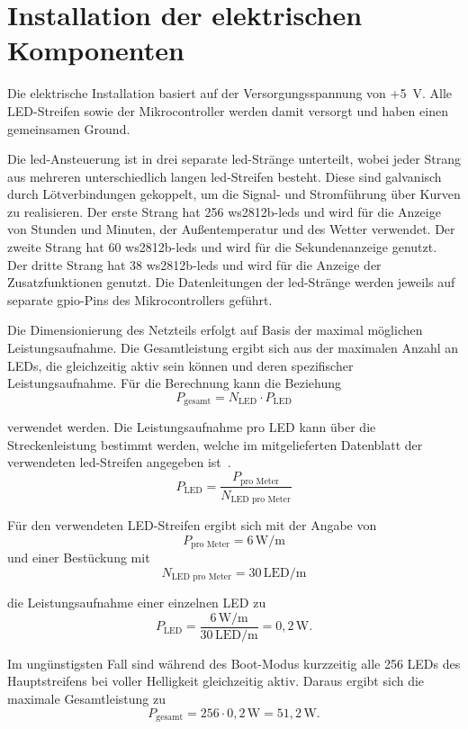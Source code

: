 \section{Installation der elektrischen Komponenten}
Die elektrische Installation basiert auf der Versorgungsspannung von +5~V.  
Alle LED-Streifen sowie der Mikrocontroller werden damit versorgt und haben einen gemeinsamen Ground.  

Die \gls{led}-Ansteuerung ist in drei separate \gls{led}-Stränge unterteilt, wobei jeder Strang aus mehreren unterschiedlich langen \gls{led}-Streifen besteht.
Diese sind galvanisch durch Lötverbindungen gekoppelt, um die Signal- und Stromführung über Kurven zu realisieren.
Der erste Strang hat 256 \gls{ws2812b}-\gls{led}s und wird für die Anzeige von Stunden und Minuten, der Außentemperatur und des Wetter verwendet.  
Der zweite Strang hat 60 \gls{ws2812b}-\gls{led}s und wird für die Sekundenanzeige genutzt.
Der dritte Strang hat 38 \gls{ws2812b}-\gls{led}s und wird für die Anzeige der Zusatzfunktionen genutzt.
Die Datenleitungen der \gls{led}-Stränge werden jeweils auf separate \gls{gpio}-Pins des Mikrocontrollers geführt.  

Die Dimensionierung des Netzteils erfolgt auf Basis der maximal möglichen Leistungsaufnahme.  
Die Gesamtleistung ergibt sich aus der maximalen Anzahl an LEDs, die gleichzeitig aktiv sein können und deren spezifischer Leistungsaufnahme.  
Für die Berechnung kann die Beziehung  
\[
P_{\text{gesamt}} = N_{\text{LED}} \cdot P_{\text{LED}}
\]

verwendet werden.
Die Leistungsaufnahme pro LED kann über die Streckenleistung bestimmt werden, welche im mitgelieferten Datenblatt der verwendeten \gls{led}-Streifen angegeben ist~\cite{AZDelivery}.  
\[
P_{\text{LED}} = \frac{P_{\text{pro Meter}}}{N_{\text{LED pro Meter}}}
\]

Für den verwendeten LED-Streifen ergibt sich mit der Angabe von  
\[
P_{\text{pro Meter}} = 6\,\text{W/m}
\]
und einer Bestückung mit  
\[
N_{\text{LED pro Meter}} = 30\,\text{LED/m}
\]

die Leistungsaufnahme einer einzelnen LED zu  
\[
P_{\text{LED}} = \frac{6\,\text{W/m}}{30\,\text{LED/m}}
= 0{,}2\,\text{W}.
\]

Im ungünstigsten Fall sind während des Boot-Modus kurzzeitig alle 256 LEDs des Hauptstreifens bei voller Helligkeit gleichzeitig aktiv. 
Daraus ergibt sich die maximale Gesamtleistung zu  
\[
P_{\text{gesamt}} = 256 \cdot 0{,}2\,\text{W}
= 51{,}2\,\text{W}.
\]

